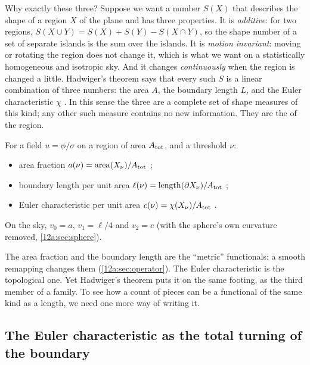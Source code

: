 Why exactly these three? Suppose we want a number $S(X)$ that describes the shape of a region $X$ of the
plane and has three properties. It is \emph{additive}: for two regions,
$S(X\cup Y)=S(X)+S(Y)-S(X\cap Y)$, so the shape number of a set of separate islands is the sum over the
islands. It is \emph{motion invariant}: moving or rotating the region does not change it, which is what we
want on a statistically homogeneous and isotropic sky. And it changes \emph{continuously} when the region is
changed a little. Hadwiger's theorem says that every such $S$ is a linear combination of three numbers: the
area $A$, the boundary length $L$, and the Euler characteristic $\chi$ \cite{SchmalzingGorski1998}. In this
sense the three are a complete set of shape measures of this kind; any other such measure contains no new
information. They are the  of the region.

\begin{workdef}
For a field $u=\phi/\sigma$ on a region of area $A_{\rm tot}$, and a threshold $\nu$:
\begin{itemize}[itemsep=1pt,leftmargin=1.2em]
  \item area fraction $a(\nu)=\mathrm{area}(X_\nu)/A_{\rm tot}$ ;
  \item boundary length per unit area $\ell(\nu)=\mathrm{length}(\partial X_\nu)/A_{\rm tot}$ ;
  \item Euler characteristic per unit area $c(\nu)=\chi(X_\nu)/A_{\rm tot}$ .
\end{itemize}
On the sky, $v_0=a$, $v_1=\ell/4$ and $v_2=c$ (with the sphere's own curvature removed, \cref{12a:sec:sphere}).
\end{workdef}

The area fraction and the boundary length are the ``metric'' functionals: a smooth remapping changes them
(\cref{12a:sec:operator}). The Euler characteristic is the topological one. Yet Hadwiger's theorem puts it on
the same footing, as the third member of a family. To see how a count of pieces can be a functional of the
same kind as a length, we need one more way of writing it.

\subsection{The Euler characteristic as the total turning of the boundary}
\label{12a:sec:turning}

